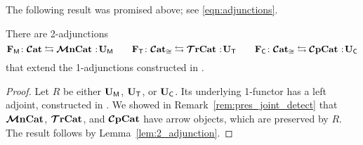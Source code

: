 \documentclass[11pt,oneside,article]{memoir}
\begin{document}
The following result was promised above; see \eqref{eqn:adjunctions}.

\begin{corollary}
      \label{cor:2_adjunctions_MonTrComp}
   There are 2-adjunctions
   \[
      \FM\colon\CCat\leftrightarrows\MMonCat\cocolon\UM
      \qquad
      \FT\colon\CCat_{\iso}\leftrightarrows\TTrCat\cocolon\UT
      \qquad
      \FC\colon\CCat_{\iso}\leftrightarrows\CCompCat\cocolon\UC
   \]
   that extend the 1-adjunctions constructed in \cite{Abramsky2}.
\end{corollary}
\begin{proof}
   Let $R$ be either $\mathbf{U}_{\mathsf{M}}$, $\mathbf{U}_{\mathsf{T}}$, or $\mathbf{U}_{\mathsf{C}}$. Its underlying 1-functor has a left adjoint,
   constructed in \cite{Abramsky2}. We showed in Remark~\ref{rem:pres_joint_detect} that $\bm{\mathcal{M}}\mathbf{nCat}$,
   $\bm{\mathcal{T}}\mathbf{rCat}$, and $\bm{\mathcal{C}}\mathbf{pCat}$ have arrow objects, which are preserved by $R$. The result follows by
   Lemma~\ref{lem:2_adjunction}.
\end{proof}
\end{document}
